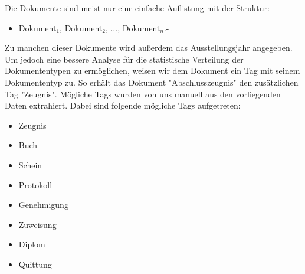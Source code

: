 Die Dokumente sind meist nur eine einfache Auflistung mit der Struktur:

\begin{itemize}
 \item Dokument$_1$, Dokument$_2$, ..., Dokument$_n$.-
\end{itemize}

\noindent
Zu manchen dieser Dokumente wird außerdem das Ausstellungsjahr angegeben. Um jedoch eine bessere Analyse für die statistische Verteilung der Dokumententypen zu ermöglichen, weisen wir dem Dokument ein Tag mit seinem Dokumententyp zu. So erhält das Dokument "{}Abschlusszeugnis"{} den zusätzlichen Tag "{}Zeugnis"{}. Mögliche Tags wurden von uns manuell aus den vorliegenden Daten extrahiert. Dabei sind folgende mögliche Tags aufgetreten: 

\begin{itemize}
\vspace*{-0.2cm}
 \item Zeugnis
\vspace*{-0.2cm}
 \item Buch
\vspace*{-0.2cm} 
 \item Schein
\vspace*{-0.2cm} 
 \item Protokoll
\vspace*{-0.2cm} 
 \item Genehmigung
\vspace*{-0.2cm} 
 \item Zuweisung
\vspace*{-0.2cm} 
 \item Diplom
\vspace*{-0.2cm} 
 \item Quittung
\end{itemize}
